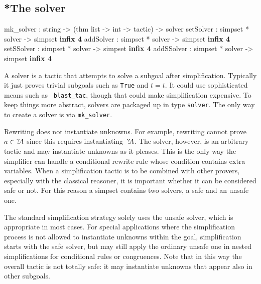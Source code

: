 \subsection{*The solver}\label{sec:simp-solver}
\begin{ttbox}
mk_solver  : string -> (thm list -> int -> tactic) -> solver
setSolver  : simpset * solver -> simpset \hfill{\bf infix 4}
addSolver  : simpset * solver -> simpset \hfill{\bf infix 4}
setSSolver : simpset * solver -> simpset \hfill{\bf infix 4}
addSSolver : simpset * solver -> simpset \hfill{\bf infix 4}
\end{ttbox}

A solver is a tactic that attempts to solve a subgoal after
simplification.  Typically it just proves trivial subgoals such as
\texttt{True} and $t=t$.  It could use sophisticated means such as {\tt
  blast_tac}, though that could make simplification expensive.
To keep things more abstract, solvers are packaged up in type
\texttt{solver}. The only way to create a solver is via \texttt{mk_solver}.

Rewriting does not instantiate unknowns.  For example, rewriting
cannot prove $a\in {?\!A}$ since this requires
instantiating~${?\!A}$.  The solver, however, is an arbitrary tactic
and may instantiate unknowns as it pleases.  This is the only way the
simplifier can handle a conditional rewrite rule whose condition
contains extra variables.  When a simplification tactic is to be
combined with other provers, especially with the classical reasoner,
it is important whether it can be considered safe or not.  For this
reason a simpset contains two solvers, a safe and an unsafe one.

The standard simplification strategy solely uses the unsafe solver,
which is appropriate in most cases.  For special applications where
the simplification process is not allowed to instantiate unknowns
within the goal, simplification starts with the safe solver, but may
still apply the ordinary unsafe one in nested simplifications for
conditional rules or congruences. Note that in this way the overall
tactic is not totally safe:  it may instantiate unknowns that appear also 
in other subgoals.

